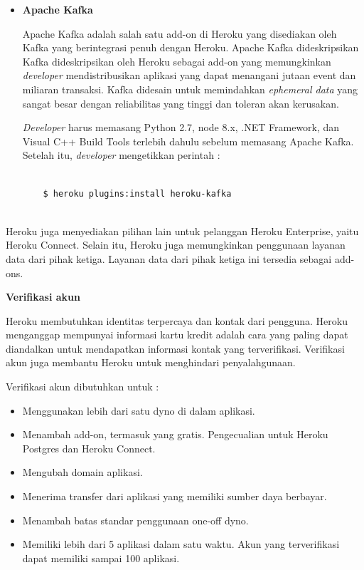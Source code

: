 \documentclass[a4paper,twoside]{article}
\begin{document}
\begin{enumerate}
\begin{enumerate}
\begin{itemize}
\item \textbf{Apache Kafka}

Apache Kafka adalah salah satu add-on di Heroku yang disediakan oleh Kafka yang berintegrasi penuh dengan Heroku. Apache Kafka dideskripsikan Kafka dideskripsikan oleh Heroku sebagai add-on yang memungkinkan \textit{developer} mendistribusikan aplikasi yang dapat menangani jutaan event dan miliaran transaksi. Kafka didesain untuk memindahkan \textit{ephemeral data} yang sangat besar dengan reliabilitas yang tinggi dan toleran akan kerusakan.

\textit{Developer} harus memasang Python 2.7, node 8.x, .NET Framework, dan Visual C++ Build Tools terlebih dahulu sebelum memasang Apache Kafka. Setelah itu, \textit{developer} mengetikkan perintah :
\begin{lstlisting}
	
	$ heroku plugins:install heroku-kafka
	
\end{lstlisting}
\end{itemize}
Heroku juga menyediakan pilihan lain untuk pelanggan Heroku Enterprise, yaitu Heroku Connect. Selain itu, Heroku juga memungkinkan penggunaan layanan data dari pihak ketiga. Layanan data dari pihak ketiga ini tersedia sebagai add-ons.

			\textbf{Verifikasi akun}
			
			Heroku membutuhkan identitas terpercaya dan kontak dari pengguna. Heroku menganggap mempunyai informasi kartu kredit adalah cara yang paling dapat diandalkan untuk mendapatkan informasi kontak yang terverifikasi. Verifikasi akun juga membantu Heroku untuk menghindari penyalahgunaan.

Verifikasi akun dibutuhkan untuk :
\begin{itemize}
\item Menggunakan lebih dari satu dyno di dalam aplikasi.
\item Menambah add-on, termasuk yang gratis. Pengecualian untuk Heroku Postgres dan Heroku Connect.
\item Mengubah domain aplikasi.
\item Menerima transfer dari aplikasi yang memiliki sumber daya berbayar.
\item Menambah batas standar penggunaan one-off dyno.
\item Memiliki lebih dari 5 aplikasi dalam satu waktu.  Akun yang terverifikasi dapat memiliki sampai 100 aplikasi.
\end{itemize}


\end{enumerate}
\end{enumerate}
\end{document}
